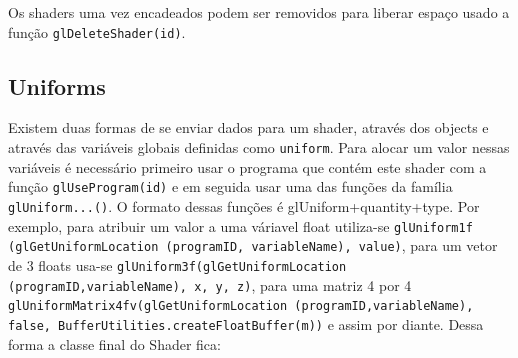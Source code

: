 \documentclass[12pt, 
openright, 
oneside, 
a4paper,    
brazil]{facom-ufu-abntex2}
\begin{document}
Os shaders uma vez encadeados podem ser removidos para liberar espaço usado a função \texttt{glDeleteShader(id)}.

\subsection{Uniforms}

Existem duas formas de se enviar dados para um shader, através dos objects e através das variáveis globais definidas como \texttt{uniform}. Para alocar um valor nessas variáveis é necessário primeiro usar o programa que contém este shader com a função \texttt{glUseProgram(id)} e em seguida usar uma das funções da família \texttt{glUniform...()}. O formato dessas funções é glUniform+quantity+type. Por exemplo, para atribuir um valor a uma váriavel float utiliza-se \texttt{glUniform1f (glGetUniformLocation (programID, variableName), value)}, para um vetor de 3 floats usa-se \texttt{glUniform3f(glGetUniformLocation (programID,variableName), x, y, z)}, para uma matriz 4 por 4  \texttt{glUniformMatrix4fv(glGetUniformLocation (programID,variableName), false, BufferUtilities.createFloatBuffer(m))} e assim por diante.
Dessa forma a classe final do Shader fica:
\end{document}
